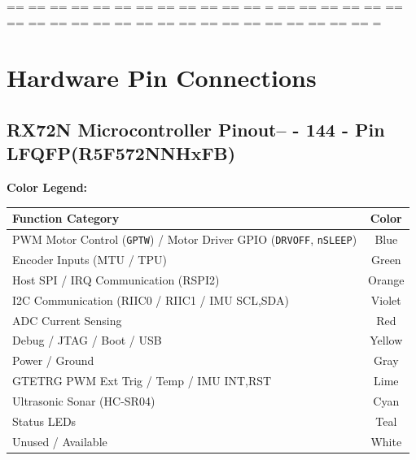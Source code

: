     == == == == == == == == == == == ==
    = %
      == == == == == == == == == == == == == == == == == == == == == == ==
    =

\newpage
\section{Hardware Pin Connections}
\label{section:hardware-pinout}

\subsection{RX72N Microcontroller Pinout-- - 144 - Pin LFQFP(R5F572NNHxFB)}

\textbf{Color Legend:}

\begin{table}[H]
\centering
\small
\begin{tabular} { | l | c |}
\hline
\textbf{Function Category} & \textbf{Color}
\\
\hline
\rowcolor{blue!20} PWM Motor Control (\texttt{GPTW}) / Motor Driver GPIO (\texttt{DRVOFF}, \texttt{nSLEEP}) & Blue \\
\hline
\rowcolor{green!20} Encoder Inputs (MTU / TPU) & Green \\
\hline
\rowcolor{orange!20} Host SPI / IRQ Communication (RSPI2) & Orange \\
\hline
\rowcolor{violet!15} I2C Communication (RIIC0 / RIIC1 / IMU SCL,SDA) & Violet \\
\hline
\rowcolor{red!15} ADC Current Sensing & Red \\
\hline
\rowcolor{yellow!15} Debug / JTAG / Boot / USB & Yellow \\
\hline
\rowcolor{gray!15} Power / Ground & Gray \\
\hline
\rowcolor{lime!10} GTETRG PWM Ext Trig / Temp / IMU INT,RST & Lime \\
\hline
\rowcolor{cyan!15} Ultrasonic Sonar (HC-SR04) & Cyan \\
\hline
\rowcolor{teal!15} Status LEDs & Teal \\
\hline Unused / Available & White \\
\hline
\end{tabular}
\end{table}

